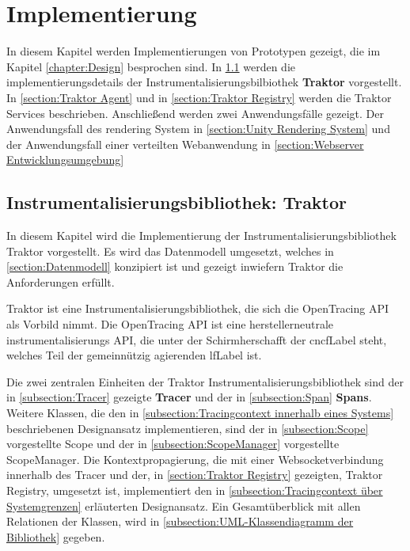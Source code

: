 %
\chapter{Implementierung}
\label{chapter:Implementierung}

In diesem Kapitel werden Implementierungen von Prototypen gezeigt, die im Kapitel \cref{chapter:Design} besprochen sind. In \cref{section:Instrumentalisierungsbibliothek: Traktor} werden die implementierungsdetails der Instrumentalisierungsbilbiothek \textbf{Traktor} vorgestellt. In \cref{section:Traktor Agent} und in \cref{section:Traktor Registry} werden die Traktor Services beschrieben. Anschließend werden zwei Anwendungsfälle gezeigt. Der Anwendungsfall des rendering System in \cref{section:Unity Rendering System} und der Anwendungsfall einer verteilten Webanwendung in \cref{section:Webserver Entwicklungsumgebung}

\section{Instrumentalisierungsbibliothek: Traktor}
\label{section:Instrumentalisierungsbibliothek: Traktor}
In diesem Kapitel wird die Implementierung der Instrumentalisierungsbibliothek Traktor vorgestellt. Es wird das Datenmodell umgesetzt, welches in \cref{section:Datenmodell} konzipiert ist und gezeigt inwiefern Traktor die Anforderungen erfüllt.

Traktor ist eine Instrumentalisierungsbibliothek, die sich die OpenTracing API als Vorbild nimmt. Die OpenTracing API ist eine herstellerneutrale instrumentalisierungs API, die unter der Schirmherschafft der \gls{cncfLabel} steht, welches Teil der gemeinnützig agierenden \gls{lfLabel} ist.

Die zwei zentralen Einheiten der Traktor Instrumentalisierungsbibliothek sind der in \cref{subsection:Tracer} gezeigte \textbf{Tracer} und der in \cref{subsection:Span} \textbf{Spans}. Weitere Klassen, die den in \cref{subsection:Tracingcontext innerhalb eines Systems} beschriebenen Designansatz implementieren, sind der in \cref{subsection:Scope} vorgestellte Scope und der in \cref{subsection:ScopeManager} vorgestellte ScopeManager. Die Kontextpropagierung, die mit einer Websocketverbindung innerhalb des Tracer und der, in \cref{section:Traktor Registry} gezeigten, Traktor Registry, umgesetzt ist, implementiert den in \cref{subsection:Tracingcontext über Systemgrenzen} erläuterten Designansatz. Ein Gesamtüberblick mit allen Relationen der Klassen, wird in \cref{subsection:UML-Klassendiagramm der Bibliothek} gegeben.

